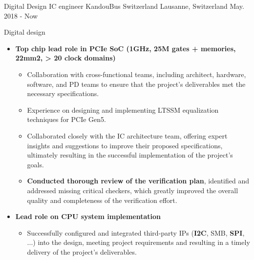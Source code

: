 

\begin{cventries}

  \cventry
    {Digital Design IC engineer} %
    {KandouBus Switzerland} %
    {Lausanne, Switzerland} %
    {May. 2018 - Now} %
    {
      \begin{cvitems} %
        \item {Digital design}
        \begin{itemize}
          \item {\textbf{Top chip lead role in PCIe SoC (1GHz, 25M gates + memories, 22mm2, > 20 clock domains)}}
          \begin{itemize}
            \item {Collaboration with cross-functional teams, including architect, hardware, software, and PD teams to ensure that the project's deliverables met the necessary specifications.}
            \item {Experience on designing and implementing LTSSM equalization techniques for PCIe Gen5.}
            \item {Collaborated closely with the IC architecture team, offering expert insights and suggestions to improve their proposed specifications, ultimately resulting in the successful implementation of the project's goals.}
            \item {\textbf{Conducted thorough review of the verification plan}, identified and addressed missing critical checkers, which greatly improved the overall quality and completeness of the verification effort.}
          \end{itemize}
          \item {\textbf{Lead role on CPU system implementation}}
          \begin{itemize}
            \item {Successfully configured and integrated third-party IPs (\textbf{I2C}, SMB, \textbf{SPI}, ...) into the design, meeting project requirements and resulting in a timely delivery of the project's deliverables.}

\end{itemize}
\end{itemize}
\end{cvitems}}
\end{cventries}
